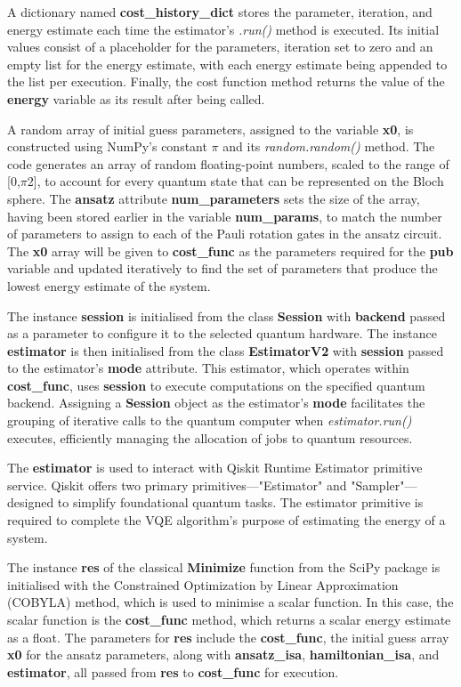\documentclass{article}
\begin{document}
{A dictionary named \textbf{cost\_history\_dict} stores the parameter, iteration, and energy estimate each time the estimator's \textit{.run()} method is executed. Its initial values consist of a placeholder for the parameters, iteration set to zero and an empty list for the energy estimate, with each energy estimate being appended to the list per execution. Finally, the cost function method returns the value of the \textbf{energy} variable as its result after being called.

A random array of initial guess parameters, assigned to the variable \textbf{x0}, is constructed using NumPy’s constant $\pi$ and its \textit{random.random()} method. The code generates an array of random floating-point numbers, scaled to the range of [0,$\pi$2], to account for every quantum state that can be represented on the Bloch sphere. The \textbf{ansatz} attribute \textbf{num\_parameters} sets the size of the array, having been stored earlier in the variable \textbf{num\_params}, to match the number of parameters to assign to each of the Pauli rotation gates in the ansatz circuit. The \textbf{x0} array will be given to \textbf{cost\_func} as the parameters required for the \textbf{pub} variable and updated iteratively to find the set of parameters that produce the lowest energy estimate of the system.

The instance \textbf{session} is initialised from the class \textbf{Session} with \textbf{backend} passed as a parameter to configure it to the selected quantum hardware. The instance \textbf{estimator} is then initialised from the class \textbf{EstimatorV2} with \textbf{session} passed to the estimator's \textbf{mode} attribute. This estimator, which operates within \textbf{cost\_func}, uses \textbf{session} to execute computations on the specified quantum backend. Assigning a  \textbf{Session} object as the estimator's \textbf{mode} facilitates the grouping of iterative calls to the quantum computer\cite{Session} when \textit{estimator.run()} executes, efficiently managing the allocation of jobs to quantum resources.

The \textbf{estimator} is used to interact with Qiskit Runtime Estimator primitive service\cite{EstimatorV2}. Qiskit offers two primary primitives—"Estimator" and "Sampler"—designed to simplify foundational quantum tasks\cite{QiskitRuntime}. The estimator primitive is required to complete the VQE algorithm's purpose of estimating the energy of a system.

The instance \textbf{res} of the classical \textbf{Minimize} function from the SciPy package is initialised with the Constrained Optimization by Linear Approximation (COBYLA) method, which is used to minimise a scalar function. In this case, the scalar function is the \textbf{cost\_func} method, which returns a scalar energy estimate as a float. The parameters for \textbf{res} include the \textbf{cost\_func}, the initial guess array \textbf{x0} for the ansatz parameters, along with \textbf{ansatz\_isa}, \textbf{hamiltonian\_isa}, and \textbf{estimator}, all passed from \textbf{res} to \textbf{cost\_func} for execution. 

}
\end{document}
